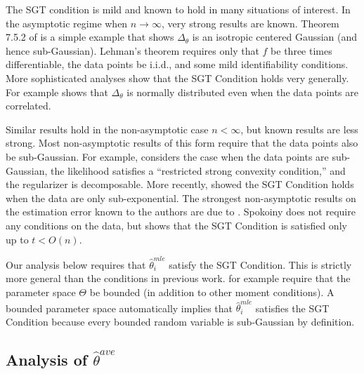 \documentclass[twoside]{article}
\newcommand{\w}{\theta}
\newcommand{\wave}{\hat\w^{ave}}
\newcommand{\wmle}{\hat\w^{mle}}
\begin{document}

The SGT condition is mild and known to hold in many situations of interest.
In the asymptotic regime when $n\to\infty$,
very strong results are known.
Theorem 7.5.2 of \cite{lehmann1999elements} is a simple example that shows $\Delta_\theta$ is an isotropic centered Gaussian
(and hence sub-Gaussian).
Lehman's theorem requires only that $f$ be three times differentiable,
the data points be i.i.d.,
and some mild identifiability conditions.
More sophisticated analyses show that the SGT Condition holds very generally.
For example \cite{spokoiny2012parametricestimation} shows that $\Delta_\w$ is normally distributed even when the data points are correlated.

Similar results hold in the non-asymptotic case $n<\infty$,
but known results are less strong.
Most non-asymptotic results of this form require that the data points also be sub-Gaussian.
For example, \cite{negahban2009unified} considers the case when the data points are sub-Gaussian, the likelihood satisfies a ``restricted strong convexity condition,'' and the regularizer is decomposable.
More recently, \cite{sivakumar2015beyond} showed the SGT Condition holds when the data are only sub-exponential.
The strongest non-asymptotic results on the estimation error known to the authors are due to \cite{spokoiny2012parametricestimation}.
Spokoiny does not require any conditions on the data,
but shows that the SGT Condition is satisfied only up to $t < O(n)$.

Our analysis below requires that $\wmle_i$ satisfy the SGT Condition.
This is strictly more general than the conditions in previous work.
\cite{zhang2012communication} for example require that the parameter space $\Theta$ be bounded (in addition to other moment conditions).
A bounded parameter space automatically implies that $\wmle_i$ satisfies the SGT Condition because every bounded random variable is sub-Gaussian by definition.


\subsection{Analysis of $\wave$}
\end{document}
